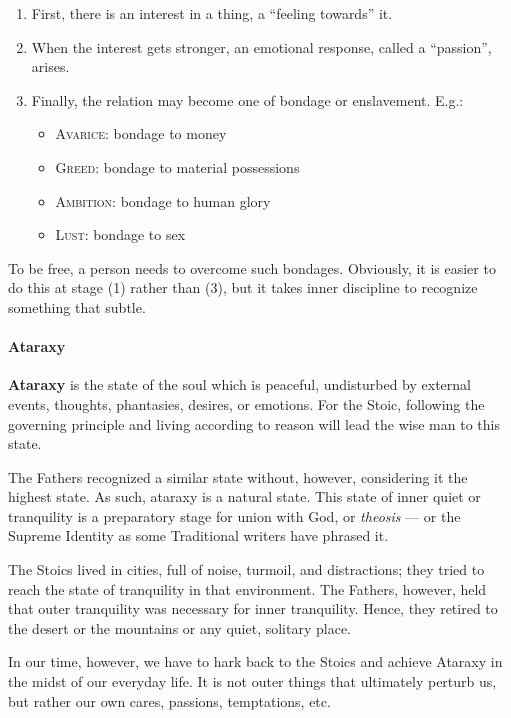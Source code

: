 \begin{enumerate}
\item First, there is an interest in a thing, a “feeling towards” it. 
\item When the interest gets stronger, an emotional response, called a “passion”, arises. 
\item Finally, the relation may become one of bondage or enslavement. E.g.: 

\begin{itemize}[nosep]
\item \textsc{Avarice}: bondage to money 
\item \textsc{Greed}: bondage to material possessions 
\item \textsc{Ambition}: bondage to human glory 
\item \textsc{Lust}: bondage to sex 
\end{itemize}
\end{enumerate}
To be free, a person needs to overcome such bondages. Obviously, it is easier to do this at stage (1) rather than (3),
but it takes inner discipline to recognize something that subtle.

\paragraph{Ataraxy}
\textbf{Ataraxy} is the state of the soul which is peaceful, undisturbed by external events, thoughts, phantasies,
desires, or emotions. For the Stoic, following the governing principle and living according to reason will lead the
wise man to this state.

The Fathers recognized a similar state without, however, considering it the highest state. As such, ataraxy is a natural
state. This state of inner quiet or tranquility is a preparatory stage for union with God, or \emph{theosis}
— or the Supreme Identity as some Traditional writers have phrased it.

The Stoics lived in cities, full of noise, turmoil, and distractions; they tried to reach the state of tranquility in
that environment. The Fathers, however, held that outer tranquility was necessary for inner tranquility. Hence, they
retired to the desert or the mountains or any quiet, solitary place.

In our time, however, we have to hark back to the Stoics and achieve Ataraxy in the midst of our everyday life. It is
not outer things that ultimately perturb us, but rather our own cares, passions, temptations, etc.

